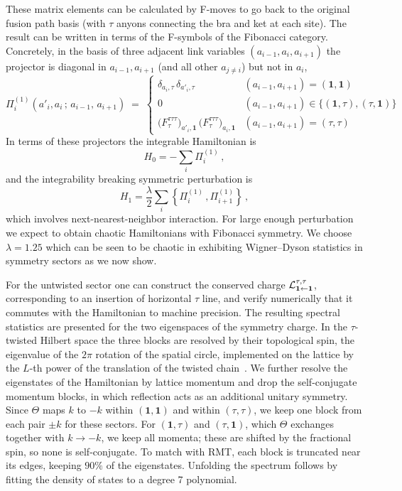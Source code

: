 \documentclass[11pt]{article}
\numberwithin{equation}{section}
\begin{document}
These matrix elements can be calculated by { F-moves} to go back to the original fusion path basis (with $\tau$ anyons { connecting} the bra and ket at each site). The result can be written in terms of the F-symbols of the Fibonacci category. Concretely, in the basis of three adjacent link variables $(a_{i-1},a_i,a_{i+1})$ the projector is diagonal in $a_{i-1}, a_{i+1}$ (and all other $a_{j \neq i}$) but not in $a_i$,
\begin{equation}
   \Pi^{(1)}_i(a'_i, a_i\,;\, a_{i-1},\, a_{i+1}) \;=\;
   \begin{cases}
      \delta_{a_i,\tau}\,\delta_{a'_i,\tau}
         & (a_{i-1},a_{i+1})=(\mathbf 1,\mathbf 1)\\[2pt]
      0
         & (a_{i-1},a_{i+1})\in\{(\mathbf 1,\tau),(\tau,\mathbf 1)\}\\[2pt]
      \bigl(F^{\tau\tau\tau}_{\tau}\bigr)_{a'_i,\mathbf 1}\,
      \bigl(F^{\tau\tau\tau}_{\tau}\bigr)_{a_i,\mathbf 1}
         & (a_{i-1},a_{i+1})=(\tau,\tau)
   \end{cases}
   \label{eq:pi-kernel}
\end{equation}
 In terms of these projectors the integrable Hamiltonian is  
\begin{equation}
    H_0=-  \sum_i \Pi^{(1)}_{i} \,,  
\end{equation}
and the integrability breaking symmetric perturbation is
\begin{equation}
    H_1= \frac{\lambda}{2} \sum_i \left\{\Pi^{(1)}_{i}\, , \Pi^{(1)}_{i+1}\right\}\,,
\end{equation}
which involves next-nearest-neighbor interaction. For large enough perturbation we expect to obtain chaotic Hamiltonians with Fibonacci symmetry. We choose $\lambda =1.25$  which can be seen to be chaotic in exhibiting Wigner--Dyson statistics in symmetry sectors as we now show.

For the untwisted sector one can construct the conserved charge $\mathcal{L}^{\tau,\tau}_{\mathbf 1\leftarrow \mathbf 1}$, corresponding to an insertion of horizontal $\tau$ line, and verify numerically that it commutes with the Hamiltonian to machine precision. The resulting spectral statistics {are} presented for the two eigenspaces of the symmetry charge. In the $\tau$-twisted Hilbert space the three blocks are resolved by their topological spin, the eigenvalue of the $2\pi$ rotation of the spatial circle, implemented on the lattice by the $L$-th power of the translation of the twisted chain{~\cite{Jensen:2026cat}}. We further resolve the eigenstates of the Hamiltonian by lattice momentum and drop the self-conjugate momentum blocks, in which reflection acts as an additional unitary symmetry. {Since $\Theta$ maps $k$ to $-k$ within $(\mathbf 1,\mathbf 1)$ and within $(\tau,\tau)$, we keep one block from each pair $\pm k$ for these sectors. For $(\mathbf 1,\tau)$ and $(\tau,\mathbf 1)$, which $\Theta$ exchanges together with $k\to-k$, we keep all momenta; these are shifted by the fractional spin, so none is self-conjugate.} To match with RMT, each block is truncated near its edges, keeping $90\%$ of the eigenstates. Unfolding the spectrum follows by fitting the density of states to a degree 7 polynomial.
\end{document}
